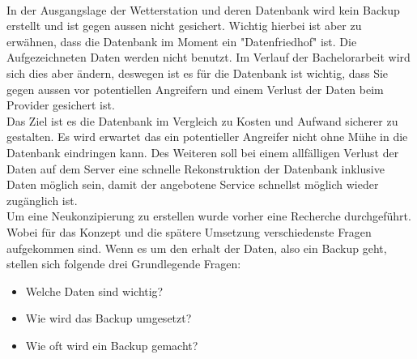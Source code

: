 \\
In der Ausgangslage der Wetterstation und deren Datenbank wird kein Backup erstellt und ist gegen aussen nicht gesichert. Wichtig hierbei ist aber zu erwähnen, dass die Datenbank im Moment ein "Datenfriedhof" ist. Die Aufgezeichneten Daten werden nicht benutzt. Im Verlauf der Bachelorarbeit wird sich dies aber ändern, deswegen ist es für die Datenbank ist wichtig, dass Sie gegen aussen vor potentiellen Angreifern und einem Verlust der Daten beim Provider gesichert ist. \\
Das Ziel ist es die Datenbank im Vergleich zu Kosten und Aufwand sicherer zu gestalten. Es wird erwartet das ein potentieller Angreifer nicht ohne Mühe in die Datenbank eindringen kann. Des Weiteren soll bei einem allfälligen Verlust der Daten auf dem Server eine schnelle Rekonstruktion der Datenbank inklusive Daten möglich sein, damit der angebotene Service schnellst möglich wieder zugänglich ist.\\ 
Um eine Neukonzipierung zu erstellen wurde vorher eine Recherche durchgeführt. Wobei für das Konzept und die spätere Umsetzung verschiedenste Fragen aufgekommen sind. Wenn es um den erhalt der Daten, also ein Backup geht, stellen sich folgende drei Grundlegende Fragen:
 \begin{itemize}
\item Welche Daten sind wichtig?
\item Wie wird das Backup umgesetzt?
\item Wie oft wird ein Backup gemacht?
\end{itemize}

